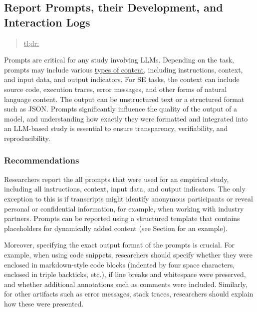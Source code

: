 



\subsection{Report Prompts, their Development, and Interaction Logs}
\label{sec:report-prompts-their-development-and-interaction-logs}

\begin{quote}
\underline{tl;dr:} 
\end{quote}

Prompts are critical for any study involving LLMs.
Depending on the task, prompts may include various \href{https://www.promptingguide.ai/introduction/elements}{types of content}, including instructions, context, and input data, and output indicators.
For SE tasks, the context can include source code, execution traces, error messages, and other forms of natural language content.
The output can be unstructured text or a structured format such as JSON.
Prompts significantly influence the quality of the output of a model, and understanding how exactly they were formatted and integrated into an LLM-based study is essential to ensure transparency, verifiability, and reproducibility.

\subsubsection{Recommendations}

Researchers \must report the all prompts that were used for an empirical study, including all instructions, context, input data, and output indicators.
The only exception to this is if transcripts might identify anonymous participants or reveal personal or confidential information, for example, when working with industry partners.
Prompts can be reported using a structured template that contains placeholders for dynamically added content (see Section \judges for an example).

Moreover, specifying the exact output format of the prompts is crucial.
For example, when using code snippets, researchers should specify whether they were enclosed in markdown-style code blocks (indented by four space characters, enclosed in triple backticks, etc.), if line breaks and whitespace were preserved, and whether additional annotations such as comments were included.
Similarly, for other artifacts such as error messages, stack traces, researchers should explain how these were presented.

